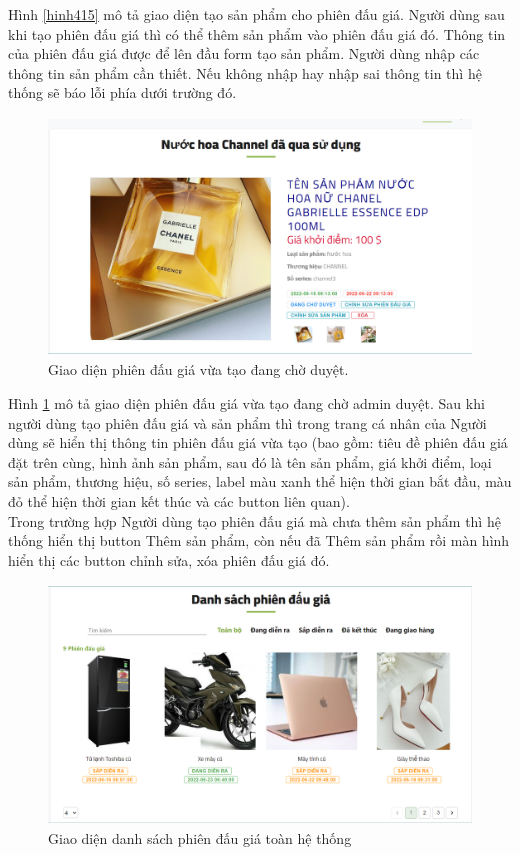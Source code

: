 \documentclass{article}
\begin{document}
Hình \ref{hinh415} mô tả giao diện tạo sản phẩm cho phiên đấu giá. Người dùng sau khi tạo phiên đấu giá thì có thể thêm sản phẩm vào phiên đấu giá đó. Thông tin của phiên đấu giá được để lên đầu form tạo sản phẩm. Người dùng nhập các thông tin sản phẩm cần thiết. Nếu không nhập hay nhập sai thông tin thì hệ thống sẽ báo lỗi phía dưới trường đó.
\begin{figure}[H]
    \centering
    \includegraphics[width=11.4cm,height=6.32cm]{images/auctionwait.png}
    \caption{Giao diện phiên đấu giá vừa tạo đang chờ duyệt.}
    \label{hinh416}
\end{figure}
Hình \ref{hinh416} mô tả giao diện phiên đấu giá vừa tạo đang chờ admin duyệt. Sau khi người dùng tạo phiên đấu giá và sản phẩm thì trong trang cá nhân của Người dùng sẽ hiển thị thông tin phiên đấu giá vừa tạo (bao gồm: tiêu đề phiên đấu giá đặt trên cùng, hình ảnh sản phẩm, sau đó là tên sản phẩm, giá khởi điểm, loại sản phẩm, thương hiệu, số series, label màu xanh thể hiện thời gian bắt đầu, màu đỏ thể hiện thời gian kết thúc và các button liên quan).\\
Trong trường hợp Người dùng tạo phiên đấu giá mà chưa thêm sản phẩm thì hệ thống hiển thị button Thêm sản phẩm, còn nếu đã Thêm sản phẩm rồi màn hình hiển thị các button chỉnh sửa, xóa phiên đấu giá đó. 
\begin{figure}[H]
    \centering
    \includegraphics[width=11.4cm,height=6.36cm]{images/listauctions.png}
    \caption{Giao diện danh sách phiên đấu giá toàn hệ thống}
    \label{hinh417}
\end{figure}
\end{document}
